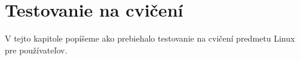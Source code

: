 \chapter{Testovanie na cvičení}
\label{kap:testovanie}

V tejto kapitole popíšeme ako prebiehalo testovanie na cvičení predmetu Linux pre používateľov.